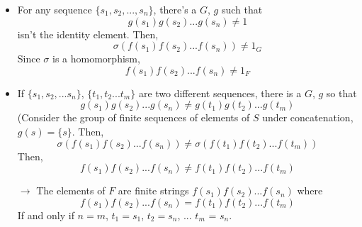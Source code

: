 \documentclass[8pt]{beamer}
\begin{document}
\begin{frame}
\begin{columns}
\begin{column}[T]{0.5\textwidth}
        \begin{itemize}
          \item For any sequence $\{s_1, s_2, ..., s_n\}$, there's a $G$, $g$
            such that
            \[g(s_1) g(s_2) ... g(s_n) \neq 1\]
            isn't the identity element. Then,
            \[\sigma(f(s_1) f(s_2) ... f(s_n)) \neq 1_G\]
            Since $\sigma$ is a homomorphism,
            \[f(s_1) f(s_2) ... f(s_n) \neq 1_F\]
          \item If $\{s_1, s_2, ... s_n\}$, $\{t_1, t_2 ... t_m\}$ are two
            different sequences, there is a $G$, $g$ so that
            \[g(s_1) g(s_2) ... g(s_n) \neq g(t_1) g(t_2) ... g(t_m)\]
            (Consider the group of finite sequences of elements of $S$ under
            concatenation, $g(s) = \{s\}$. Then,
            \[\sigma(f(s_1) f(s_2) ... f(s_n)) \neq \sigma(f(t_1) f(t_2) ...
            f(t_m))\]
            Then,
            \[f(s_1) f(s_2) ... f(s_n) \neq f(t_1) f(t_2) ... f(t_m)\]
          \item[$\rightarrow$] The elements of $F$ are finite strings
            $f(s_1) f(s_2) ... f(s_n)$ where
            \[f(s_1) f(s_2) ... f(s_n) =
            f(t_1) f(t_2) ... f(t_m)\]
            If and only if $n=m$, $t_1 = s_1$, $t_2 = s_n$, ... $t_m$ = $s_n$.
       
        \end{itemize}
      \end{column}
    \end{columns}
  \end{frame}
\end{document}
